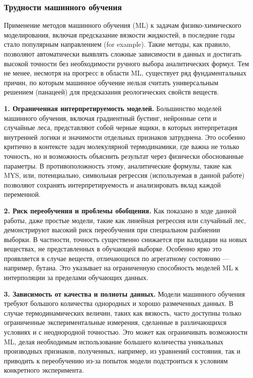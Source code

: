\documentclass[a4paper,12pt]{article}
\begin{document}
\subsubsection{Трудности машинного обучения}

Применение методов машинного обучения (ML) к задачам физико-химического моделирования, включая предсказание вязкости жидкостей, в последние годы стало популярным направлением (for example). Такие методы, как правило, позволяют автоматически выявлять сложные зависимости в данных и достигать высокой точности без необходимости ручного выбора аналитических формул. Тем не менее, несмотря на прогресс в области ML, существует ряд фундаментальных причин, по которым машинное обучение нельзя считать универсальным решением (панацеей) для предсказания реологических свойств веществ.

\textbf{1. Ограниченная интерпретируемость моделей.}
Большинство моделей машинного обучения, включая градиентный бустинг, нейронные сети и случайные леса, представляют собой черные ящики, в которых интерпретация внутренней логики и значимости отдельных признаков затруднена. Это особенно критично в контексте задач молекулярной термодинамики, где важна не только точность, но и возможность объяснить результат через физически обоснованные параметры. В противоположность этому, аналитические формулы, такие как MYS, или, потенциально, символьная регрессия (используемая в данной работе) позволяют сохранять интерпретируемость и анализировать вклад каждой переменной.

\textbf{2. Риск переобучения и проблемы обобщения.}
Как показано в ходе данной работы, даже простые модели, такие как линейная регрессия или случайный лес, демонстрируют высокий риск переобучения при специальном разбиении выборки. В частности, точность существенно снижается при валидации на новых веществах, не представленных в обучающей выборке. Особенно ярко это проявляется в случае веществ, отличающихся по агрегатному состоянию — например, бутана. Это указывает на ограниченную способность моделей ML к интерполяции за пределами обучающих данных.

\textbf{3. Зависимость от качества и полноты данных.}
Модели машинного обучения требуют большого количества однородных и хорошо размеченных данных. В случае термодинамических величин, таких как вязкость, часто доступны только ограниченные экспериментальные измерения, сделанные в различающихся условиях и с неоднородной точностью. Это может как ограничивать возможности ML, делая необходимым использование большего количества уникальных производных признаков, полученных, например, из уравнений состояния, так и приводить к переобучению из-за попыток модели подстроиться к условиям конкретного эксперимента.
\end{document}
